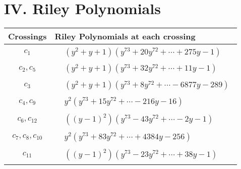 \documentclass[1p]{elsarticle_modified}
\theoremstyle{definition}
\begin{document}
\centering \section*{ IV. Riley Polynomials}
\begin{tabular}{m{50pt}|m{274pt}}
Crossings & \hspace{64pt}Riley Polynomials at each crossing \\
\hline $$\begin{aligned}c_{1}\end{aligned}$$&$\begin{aligned}
&(y^2+y+1)(y^{73}+20 y^{72}+\cdots+275 y-1)
\end{aligned}$\\
\hline $$\begin{aligned}c_{2},c_{5}\end{aligned}$$&$\begin{aligned}
&(y^2+y+1)(y^{73}+32 y^{72}+\cdots+11 y-1)
\end{aligned}$\\
\hline $$\begin{aligned}c_{3}\end{aligned}$$&$\begin{aligned}
&(y^2+y+1)(y^{73}+8 y^{72}+\cdots-6877 y-289)
\end{aligned}$\\
\hline $$\begin{aligned}c_{4},c_{9}\end{aligned}$$&$\begin{aligned}
&y^2(y^{73}+15 y^{72}+\cdots-216 y-16)
\end{aligned}$\\
\hline $$\begin{aligned}c_{6},c_{12}\end{aligned}$$&$\begin{aligned}
&((y-1)^2)(y^{73}-43 y^{72}+\cdots-2 y-1)
\end{aligned}$\\
\hline $$\begin{aligned}c_{7},c_{8},c_{10}\end{aligned}$$&$\begin{aligned}
&y^2(y^{73}+83 y^{72}+\cdots+4384 y-256)
\end{aligned}$\\
\hline $$\begin{aligned}c_{11}\end{aligned}$$&$\begin{aligned}
&((y-1)^2)(y^{73}-23 y^{72}+\cdots+38 y-1)
\end{aligned}$\\
\hline
\end{tabular}
\vskip 2pc
\end{document}
